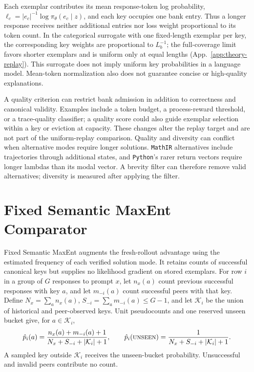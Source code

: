 \documentclass{article}
\newcommand{\1}{\mathbf 1}
\theoremstyle{remark}
\theoremstyle{definition}
\theoremstyle{plain}
\begin{document}
Each exemplar contributes its mean response-token log probability,
$\ell_c=|e_c|^{-1}\log\pi_\theta(e_c\mid z)$, and each key occupies one bank
entry. Thus a longer response receives neither additional entries nor loss
weight proportional to its token count. In the categorical surrogate with
one fixed-length exemplar per key, the corresponding key weights are
proportional to $L_b^{-1}$; the full-coverage limit favors shorter exemplars
and is uniform only at equal lengths (App.~\ref{app:theory-replay}). This
surrogate does not imply uniform key probabilities in a language model.
Mean-token normalization also does not guarantee concise or high-quality
explanations.

A quality criterion can restrict bank admission in addition to correctness
and canonical validity. Examples include a token budget, a process-reward
threshold, or a trace-quality classifier; a quality score could also guide
exemplar selection within a key or eviction at capacity. These changes
alter the replay target and are not part of the uniform-replay comparison.
Quality and diversity can conflict when alternative modes require longer
solutions. \texttt{MathIR} alternatives include trajectories through additional
states, and \texttt{Python}'s rarer return vectors require longer lambdas than its
modal vector. A brevity filter can therefore remove valid alternatives;
diversity is measured after applying the filter.

\section{Fixed Semantic MaxEnt Comparator}
\label{app:semantic-maxent}

Fixed Semantic MaxEnt augments the fresh-rollout advantage using the
estimated frequency of each verified solution mode. It retains counts of
successful canonical keys but supplies no likelihood gradient on stored
exemplars. For row $i$ in a group of $G$ responses to prompt $x$, let
$n_x(a)$ count previous successful responses with key $a$, and let
$m_{-i}(a)$ count successful peers with that key. Define
$N_x=\sum_a n_x(a)$, $S_{-i}=\sum_a m_{-i}(a)\le G-1$, and let
$\mathcal K_i$ be the union of historical and peer-observed keys. Unit
pseudocounts and one reserved unseen bucket give, for $a\in\mathcal K_i$,
\begin{equation}
  \hat p_i(a)=\frac{n_x(a)+m_{-i}(a)+1}{N_x+S_{-i}+|\mathcal K_i|+1},\qquad
  \hat p_i(\textsc{unseen})=\frac{1}{N_x+S_{-i}+|\mathcal K_i|+1}.
  \label{eq:open-set-predictor}
\end{equation}
A sampled key outside $\mathcal K_i$ receives the unseen-bucket probability.
Unsuccessful and invalid peers contribute no count.
\end{document}
